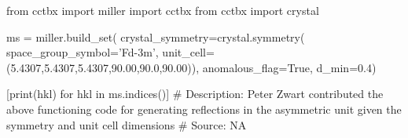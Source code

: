 from cctbx import miller
import cctbx
from cctbx import crystal

ms = miller.build_set(
    crystal_symmetry=crystal.symmetry(
        space_group_symbol='Fd-3m',
        unit_cell=(5.4307,5.4307,5.4307,90.00,90.0,90.00)),
    anomalous_flag=True,
    d_min=0.4)

[print(hkl) for hkl in ms.indices()]
# Description:  Peter Zwart contributed the above functioning code for generating reflections in the asymmetric unit given the symmetry and unit cell dimensions 
# Source:  NA

